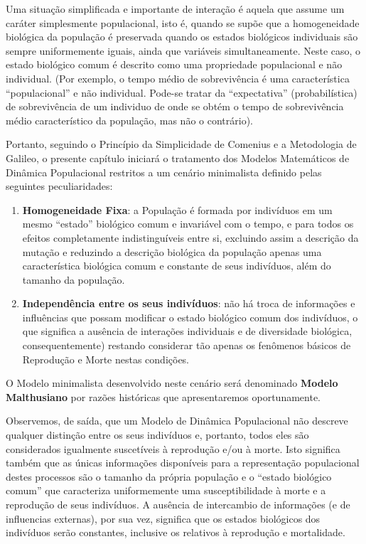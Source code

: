     Uma situação simplificada e importante de interação é aquela que assume um caráter simplesmente populacional, isto é, quando se supõe que a homogeneidade biológica da população é preservada quando os estados biológicos individuais são sempre uniformemente iguais, ainda que variáveis simultaneamente. Neste caso, o estado biológico comum é descrito como uma propriedade populacional e não individual. (Por exemplo, o tempo médio de sobrevivência é uma característica ``populacional'' e não individual. Pode-se tratar da ``expectativa'' (probabilística) de sobrevivência de um individuo de onde se obtém o tempo de sobrevivência médio característico da população, mas não o contrário).

    Portanto, seguindo o Princípio da Simplicidade de Comenius e a Metodologia de Galileo, o presente capítulo iniciará o tratamento dos Modelos Matemáticos de Dinâmica Populacional restritos a um cenário minimalista definido pelas seguintes peculiaridades:

    \begin{enumerate}
    \item \textbf{Homogeneidade Fixa}: a População é formada por indivíduos em um mesmo ``estado'' biológico comum e invariável com o tempo, e para todos os efeitos completamente indistinguíveis entre si, excluindo assim a descrição da mutação e reduzindo a descrição biológica da população apenas uma característica biológica comum e constante de seus indivíduos, além do tamanho da população.

    \item \textbf{Independência entre os seus indivíduos}: não há troca de informações e influências que possam modificar o estado biológico comum dos indivíduos, o que significa a ausência de interações individuais e de diversidade biológica, consequentemente) restando considerar tão apenas os fenômenos básicos de Reprodução e Morte nestas condições.
    \end{enumerate}

    O Modelo minimalista desenvolvido neste cenário será denominado \textbf{Modelo Malthusiano} por razões históricas que apresentaremos oportunamente.
    
    Observemos, de saída, que um Modelo de Dinâmica Populacional não descreve qualquer distinção entre os seus indivíduos e, portanto, todos eles são considerados igualmente suscetíveis à reprodução e/ou à morte. Isto significa também que as únicas informações disponíveis para a representação populacional destes processos são o tamanho da própria população e o ``estado biológico comum'' que caracteriza uniformemente uma susceptibilidade à morte e a reprodução de seus indivíduos. A ausência de intercambio de informações (e de influencias externas), por sua vez, significa que os estados biológicos dos indivíduos serão constantes, inclusive os relativos à reprodução e mortalidade.

